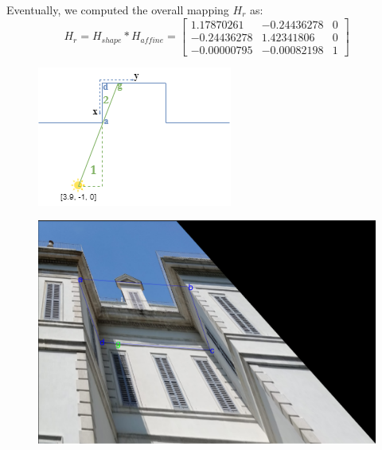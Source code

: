 \documentclass[11pt, oneside]{article}
\begin{document}
Eventually, we computed the overall mapping $H_r$ as:
\begin{equation}
	H_{r} = H_{shape} * H_{affine} =
	\begin{bmatrix}
		1.17870261 & -0.24436278 & 0 \\
		-0.24436278 & 1.42341806 & 0 \\
		-0.00000795 & -0.00082198 & 1
	\end{bmatrix}
\end{equation}


\begin{figure}[!h]
	\centering
	\begin{minipage}{.45\textwidth}
		\centering
		\includegraphics[scale = 0.75]{scene_triangles.png}
		\label{scene_triangles}
	\end{minipage}%
	\quad
	\begin{minipage}{.5\textwidth}
		\centering
		\includegraphics[scale = 0.275]{image_affine_reconstruction.png}
		\label{image_shape_reconstruction}
	\end{minipage}
\end{figure}
\end{document}
